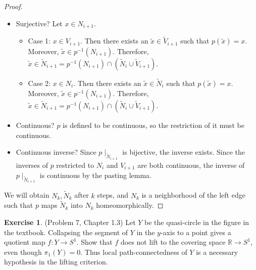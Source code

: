 \documentclass[12pt, psamsfonts]{amsart}
\theoremstyle{definition}
\newtheorem*{exer}{Exercise}
\theoremstyle{remark}
\numberwithin{equation}{section}
\begin{document}
\begin{proof}
\begin{itemize}
\begin{figure}
        \caption{Problem 5(Injectivity)}
        \label{fig:problem5_injective}
      \end{figure}
      $c$ and $p(\tilde{a})$ are path connected in $N_i$, and $c$ and $p(\tilde{b})$ are path connected in $V_{i + 1}$.
      Thus $\tilde{c}$ and $\tilde{a}$ are path connected in $\tilde{N}_i$ and $\tilde{c}$ and $\tilde{b}$ are path connected in $\tilde{V}_{i + 1}$.
      Consider the path $\gamma$ from $\tilde{a}$ to $\tilde{b}$ formed by the two paths to $\tilde{c}$.
      A small neighborhood of $\tilde{c}$ is mapped homeomorphically to a neighborhood of $c$.
      However, this implies that one of $p(\tilde{a})$ or $p(\tilde{b})$ will be located above $c$ and the other one will be located below $c$.
      This is a contradiction because $p(\tilde{a}) = p(\tilde{b})$.
    \item
      Surjective?
      Let $x \in N_{i + 1}$.
      \begin{itemize}
        \item
          Case 1: $x \in V_{i + 1}$.
          Then there exists an $\tilde{x} \in \tilde{V}_{i + 1}$ such that $p(\tilde{x}) = x$.
          Moreover, $\tilde{x} \in p^{-1}(N_{i + 1})$.
          Therefore, $\tilde{x} \in \tilde{N}_{i + 1} = p^{-1}(N_{i + 1}) \cap (\tilde{N}_i \cup \tilde{V}_{i + 1})$.
        \item
          Case 2: $x \in N_i$.
          Then there exists an $\tilde{x} \in \tilde{N}_i$ such that $p(\tilde{x}) = x$.
          Moreover, $\tilde{x} \in p^{-1}(N_{i + 1})$.
          Therefore, $\tilde{x} \in \tilde{N}_{i + 1} = p^{-1}(N_{i + 1}) \cap (\tilde{N}_i \cup \tilde{V}_{i + 1})$.
      \end{itemize}
    \item
      Continuous?
      $p$ is defined to be continuous, so the restriction of it must be continuous.
    \item
      Continuous inverse?
      Since $p\mid_{\tilde{N}_{i + 1}}$ is bijective, the inverse exists.
      Since the inverses of $p$ restricted to $N_i$ and $V_{i + 1}$ are both continuous, the inverse of $p\mid_{\tilde{N}_{i + 1}}$ is continuous by the pasting lemma.
  \end{itemize}

  We will obtain $N_k, \tilde{N}_k$ after $k$ steps, and $N_k$ is a neighborhood of the left edge such that $p$ maps $\tilde{N}_k$ into $N_k$ homeomorphically.
\end{proof}

\begin{exer}{(Problem 7, Chapter 1.3)}
  Let $Y$ be the quasi-circle in the figure in the textbook.
  Collapsing the segment of $Y$ in the $y$-axis to a point gives a quotient map $f: Y \rightarrow S^1$.
  Show that $f$ does not lift to the covering space $\mathbb{R} \rightarrow S^1$, even though $\pi_1(Y) = 0$.
  Thus local path-connectedness of $Y$ is a necessary hypothesis in the lifting criterion.
\end{exer}
\end{document}
